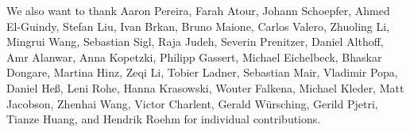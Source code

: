We also want to thank Aaron Pereira, Farah Atour, Johann Schoepfer, Ahmed El-Guindy, Stefan Liu, Ivan Brkan, Bruno Maione, Carlos Valero, Zhuoling Li, Mingrui Wang, Sebastian Sigl, Raja Judeh, Severin Prenitzer, Daniel Althoff, Amr Alanwar, Anna Kopetzki, Philipp Gassert, Michael Eichelbeck, Bhaskar Dongare, Martina Hinz, Zeqi Li, Tobier Ladner, Sebastian Mair, Vladimir Popa, Daniel Heß, Leni Rohe, Hanna Krasowski, Wouter Falkena, Michael Kleder, Matt Jacobson, Zhenhai Wang, Victor Charlent, Gerald Würsching, Gerild Pjetri, Tianze Huang, and Hendrik Roehm for individual contributions.

